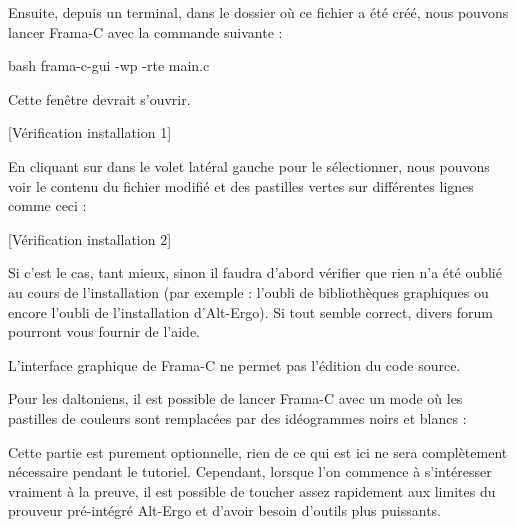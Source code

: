 Ensuite, depuis un terminal, dans le dossier où ce fichier a été créé,
nous pouvons lancer Frama-C avec la commande suivante :



\begin{CodeBlock}{bash}
frama-c-gui -wp -rte main.c
\end{CodeBlock}



Cette fenêtre devrait s'ouvrir.



[Vérification installation 1]


En cliquant sur  dans le volet latéral gauche pour le sélectionner,
nous pouvons voir le contenu du fichier  modifié et des pastilles 
vertes sur différentes lignes comme ceci :



[Vérification installation 2]


Si c'est le cas, tant mieux, sinon il faudra d'abord vérifier que rien n'a été
oublié au cours de l'installation (par exemple : l'oubli de bibliothèques graphiques
ou encore l'oubli de l'installation d'Alt-Ergo). Si tout semble correct, divers forum
pourront vous fournir de l'aide.



\begin{Warning}
L'interface graphique de Frama-C ne permet pas l'édition du code source.
\end{Warning}


\begin{Information}
Pour les daltoniens, il est possible de lancer Frama-C avec un mode où les 
pastilles de couleurs sont remplacées par des idéogrammes noirs et blancs :

\end{Information}




Cette partie est purement optionnelle, rien de ce qui est ici ne sera 
complètement nécessaire pendant le tutoriel. Cependant, lorsque l'on commence à 
s'intéresser vraiment à la preuve, il est possible de toucher assez rapidement
aux limites du prouveur pré-intégré Alt-Ergo et d'avoir besoin d'outils plus 
puissants.



